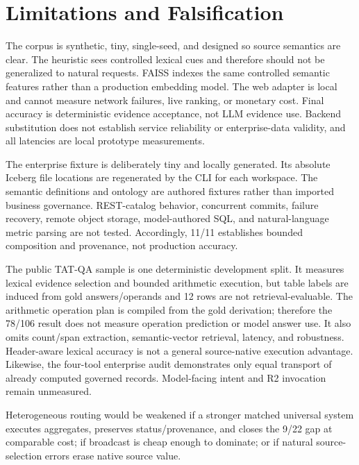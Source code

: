 \documentclass[11pt]{article}
\begin{document}
\section{Limitations and Falsification}
The corpus is synthetic, tiny, single-seed, and designed so source semantics are
clear. The heuristic sees controlled lexical cues and therefore should not be
generalized to natural requests. FAISS indexes the same controlled semantic
features rather than a production embedding model. The web adapter is local and
cannot measure network failures, live ranking, or monetary cost. Final accuracy
is deterministic evidence acceptance, not LLM evidence use. Backend substitution
does not establish service reliability or enterprise-data validity, and all
latencies are local prototype measurements.

The enterprise fixture is deliberately tiny and locally generated. Its absolute
Iceberg file locations are regenerated by the CLI for each workspace. The
semantic definitions and ontology are authored fixtures rather than imported
business governance. REST-catalog behavior, concurrent commits, failure
recovery, remote object storage, model-authored SQL, and natural-language metric
parsing are not tested. Accordingly, 11/11 establishes bounded composition and
provenance, not production accuracy.

The public TAT-QA sample is one deterministic development split. It measures
lexical evidence selection and bounded arithmetic execution, but table labels
are induced from gold answers/operands and 12 rows are not retrieval-evaluable.
The arithmetic operation plan is compiled from the gold derivation; therefore
the 78/106 result does not measure operation prediction or model answer use. It
also omits count/span extraction, semantic-vector retrieval, latency, and
robustness. Header-aware lexical accuracy is not a general source-native
execution advantage.
Likewise, the four-tool enterprise audit demonstrates only equal transport of
already computed governed records. Model-facing intent and R2 invocation remain
unmeasured.

Heterogeneous routing would be weakened if a stronger matched universal system
executes aggregates, preserves status/provenance, and closes the 9/22 gap at
comparable cost; if broadcast is cheap enough to dominate; or if natural
source-selection errors erase native source value.
\end{document}
